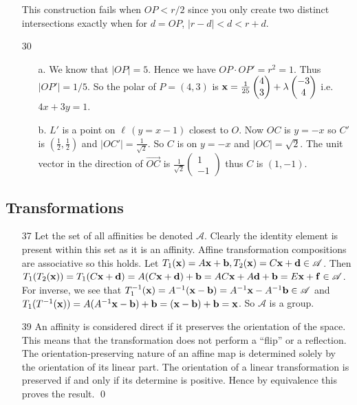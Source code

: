 \begin{enumerate}[font=\bfseries]
          This construction fails when \(OP < r / 2\) since you only create two distinct intersections exactly when for \(d = OP\), \(|r - d| < d < r + d\).
    \item[30] \begin{enumerate}[font=\bfseries]
              \item[a.] We know that \(|OP| = 5\). Hence we have \(OP \cdot OP' = r^2 = 1\). Thus \(|OP'| = 1 / 5\). So the polar of \(P = (4, 3)\) is \(\mathbf{x} = \frac{1}{25} \begin{pmatrix}
                        4 \\ 3
                    \end{pmatrix} + \lambda \begin{pmatrix}
                        -3 \\ 4
                    \end{pmatrix}\) i.e. \(4x + 3y = 1\).
              \item[b.] \(L'\) is a point on \(\ell \, (y = x - 1)\) closest to \(O\). Now \(OC\) is \(y = -x\) so \(C'\) is \((\frac{1}{2}, \frac{1}{2})\) and \(|OC'| = \frac{1}{\sqrt{2}}\). So \(C\) is on \(y = -x\) and \(|OC| = \sqrt{2}\). The unit vector in the direction of \(\overrightarrow{OC}\) is \(\frac{1}{\sqrt{2}}\begin{pmatrix}
                        1 \\ -1
                    \end{pmatrix}\) thus \(C\) is \((1, -1)\).
          \end{enumerate}
\end{enumerate}


\subsection{Transformations}
\begin{enumerate}[font=\bfseries]
    \item[37] Let the set of all affinities be denoted \(\mathscr{A}\). Clearly the identity element is present within this set as it is an affinity. Affine transformation compositions are associative so this holds. Let \(T_1(\mathbf{x}) = A\mathbf{x} + \mathbf{b}, T_2(\mathbf{x}) = C\mathbf{x} + \mathbf{d} \in \mathscr{A}\). Then \(T_1(T_2(\mathbf{x})) = T_1(C\mathbf{x} + \mathbf{d}) = A(C\mathbf{x} + \mathbf{d}) + \mathbf{b} = AC\mathbf{x} + A\mathbf{d} + \mathbf{b} = E\mathbf{x} + \mathbf{f} \in \mathscr{A}\). For inverse, we see that \(T_1^{-1}(\mathbf{x}) = A^{-1}(\mathbf{x} - \mathbf{b}) = A^{-1}\mathbf{x} - A^{-1}\mathbf{b} \in \mathscr{A}\) and \(T_1(T^{-1}(\mathbf{x})) = A(A^{-1}\mathbf{x} - \mathbf{b}) + \mathbf{b} = (\mathbf{x} - \mathbf{b}) + \mathbf{b} = \mathbf{x}\). So \(\mathscr{A}\) is a group.
    \item[39] An affinity is considered direct if it preserves the orientation of the space. This means that the transformation does not perform a ``flip'' or a reflection. The orientation-preserving nature of an affine map is determined solely by the orientation of its linear part. The orientation of a linear transformation is preserved if and only if its determine is positive. Hence by equivalence this proves the result. \qed
\end{enumerate}

